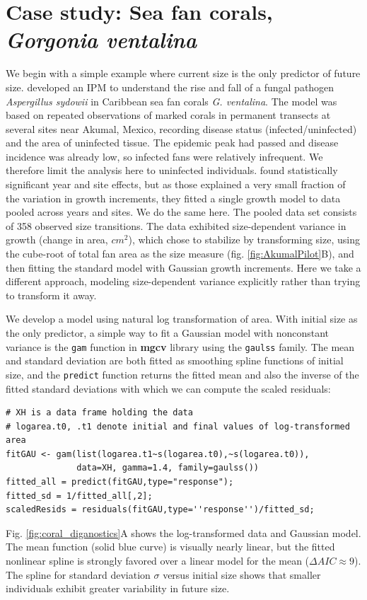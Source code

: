 \documentclass[12pt]{article}
\begin{document}
\section{Case study: Sea fan corals, \emph{Gorgonia ventalina}}
We begin with a simple example where current size is the only predictor of future size. 
\cite{bruno-etal-2011} developed an IPM to understand the rise and fall of a fungal pathogen \emph{Aspergillus sydowii} in Caribbean sea fan corals \emph{G. ventalina}. 
The model was based on repeated observations of marked corals in permanent transects at several sites near Akumal, Mexico, recording disease status (infected/uninfected) and the area of uninfected tissue. 
The epidemic peak had passed and disease incidence was already low, so infected fans were relatively infrequent. 
We therefore limit the analysis here to uninfected individuals.
\citet{bruno-etal-2011} found statistically significant year and site effects, but as those explained a very small fraction of the variation in growth increments, they fitted a single growth model to data pooled across years and sites. 
We do the same here. 
The pooled data set consists of 358 observed size transitions. 
The data exhibited size-dependent variance in growth (change in area, $cm^2$), which \cite{bruno-etal-2011} chose to stabilize by transforming size, using the cube-root of total fan area as the size measure (fig. \ref{fig:AkumalPilot}B), and then fitting the standard model with Gaussian growth increments. 
Here we take a different approach, modeling size-dependent variance explicitly rather than trying to transform it away. 

We develop a model using natural log transformation of area. 
With initial size as the only predictor, a simple way to fit a Gaussian model with nonconstant variance is the \texttt{gam} function in \textbf{mgcv} library \citep{wood-2017} using the \texttt{gaulss} family. 
The mean and standard deviation are both fitted as smoothing spline functions of initial size, and the \texttt{predict} function returns the fitted mean and also the inverse of the fitted standard deviations with which we can compute the scaled residuals: 
\begin{lstlisting}
# XH is a data frame holding the data
# logarea.t0, .t1 denote initial and final values of log-transformed area   
fitGAU <- gam(list(logarea.t1~s(logarea.t0),~s(logarea.t0)),
              data=XH, gamma=1.4, family=gaulss())
fitted_all = predict(fitGAU,type="response"); 
fitted_sd = 1/fitted_all[,2]; 
scaledResids = residuals(fitGAU,type=''response'')/fitted_sd;  
\end{lstlisting}
Fig. \ref{fig:coral_diganostics}A shows the log-transformed data and Gaussian model. 
The mean function (solid blue curve) is visually nearly linear, but the fitted nonlinear spline is strongly favored over a linear model for the mean ($\Delta AIC \approx 9$). 
The spline for standard deviation $\sigma$ versus initial size shows that smaller individuals exhibit greater variability in future size. 
\end{document}
